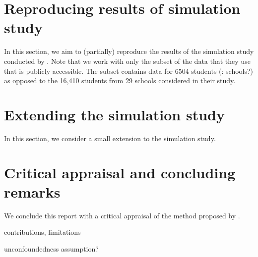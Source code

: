 \documentclass[10pt]{article}
\begin{document}
\section{Reproducing results of simulation study}

\todo In this section, we aim to (partially) reproduce the results of the simulation study conducted by \textcite{Forastiere:2021}. Note that we work with only the subset of the data that they use that is publicly accessible. The subset contains data for 6504 students (\todo: schools?) as opposed to the 16,410 students from 29 schools considered in their study.
\\


\section{Extending the simulation study}

\todo In this section, we consider a small extension to the simulation study.
\\


\section{Critical appraisal and concluding remarks}

\todo We conclude this report with a critical appraisal of the method proposed by \textcite{Forastiere:2021}.

\todo contributions, limitations

\todo unconfoundedness assumption? \textcite{Sanchez:2021}


\newpage


\begin{refcontext}[sorting=nyt]
\printbibliography
\end{refcontext}




\end{document}

